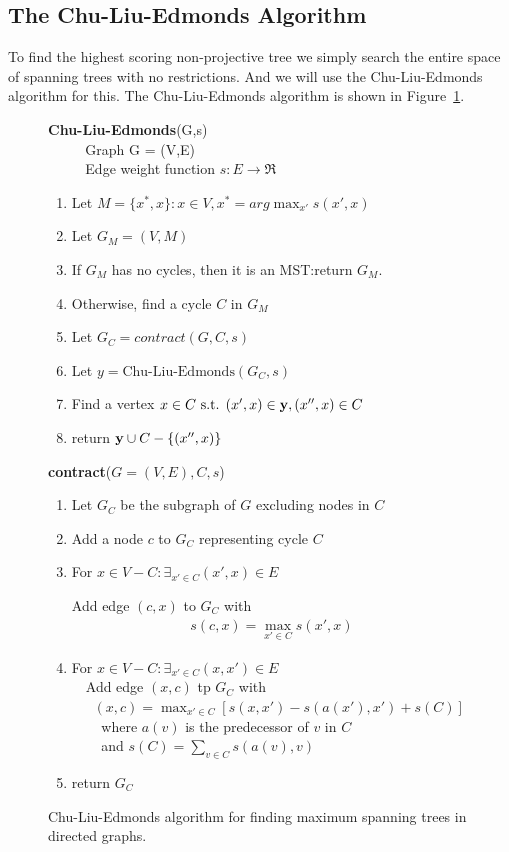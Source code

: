 \documentclass[12pt]{article}
\begin{document}
\subsection{The Chu-Liu-Edmonds Algorithm}

To find the highest scoring non-projective tree we simply search the entire space of spanning trees with no restrictions. And we will use the Chu-Liu-Edmonds algorithm for this. The Chu-Liu-Edmonds algorithm is shown in Figure~\ref{fig:chu}. \\

\begin{figure} [!bph]
  \begin{framed}
    {\bf Chu-Liu-Edmonds}(G,s) \\
    $\text {  } \; \; \; \; \; \;$ Graph G = (V,E) \\
    $\text {  } \; \; \; \; \; \; $ Edge weight function $s:E \rightarrow \Re$
    \begin{enumerate}
    \item Let $M = \{x^*, x\}: x \in V, x^* = arg \max_{x'} s(x',x)$
    \item Let $G_M = (V,M)$
    \item If $G_M$ has no cycles, then it is an MST:return $G_M$.
    \item Otherwise, find a cycle $C$ in $G_M$ 
    \item Let $G_C = contract(G,C,s)$
    \item Let $y = \text{Chu-Liu-Edmonds}(G_C, s)$
    \item Find a vertex $x \in C \text{ s.t. } (x',x) \in {\bf y}, (x'', x) \in C$
    \item return ${\bf y} \cup C - \{(x'', x)\}$
    \end{enumerate}
    {\bf contract}($G = (V,E),C,s$)
    \begin{enumerate}
    \item Let $G_C$ be the subgraph of $G$ excluding nodes in $C$
    \item Add a node $c$ to $G_C$ representing cycle $C$
    \item For $x \in V - C: \exists_{x' \in C}(x',x) \in E$

      Add edge $(c,x)$ to $G_C$ with
      \begin{eqnarray*}
        s(c,x) = \max_{x' \in C} s(x',x)
      \end{eqnarray*}
    \item For $x \in V - C: \exists_{x' \in C}(x,x') \in E$ \\
      $\text {  }$ Add edge $(x,c)$ tp $G_C$ with \\
      $\text {  } \; \;$ $(x,c) = \max_{x' \in C} [s(x,x') - s(a(x'), x') + s(C)]$ \\
      $\text {  } \; \; \; \;$ where $a(v)$ is the predecessor of $v$ in $C$ \\
      $\text {  } \; \; \; \;$ and $s(C) = \sum_{v \in C} s(a(v), v)$
    \item return $G_C$
    \end{enumerate}
  \end{framed}
  \caption{Chu-Liu-Edmonds algorithm for finding maximum spanning trees in directed graphs. \label{fig:chu}}
\end{figure}
\end{document}
